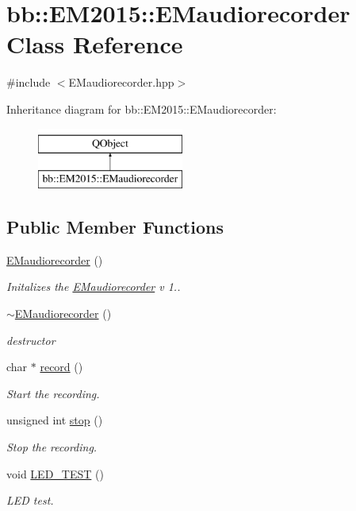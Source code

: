 \hypertarget{classbb_1_1_e_m2015_1_1_e_maudiorecorder}{}\section{bb\+:\+:E\+M2015\+:\+:E\+Maudiorecorder Class Reference}
\label{classbb_1_1_e_m2015_1_1_e_maudiorecorder}


{\ttfamily \#include $<$E\+Maudiorecorder.\+hpp$>$}

Inheritance diagram for bb\+:\+:E\+M2015\+:\+:E\+Maudiorecorder\+:\begin{figure}[H]
\begin{center}
\leavevmode
\includegraphics[height=2.000000cm]{classbb_1_1_e_m2015_1_1_e_maudiorecorder}
\end{center}
\end{figure}
\subsection*{Public Member Functions}
\begin{DoxyCompactItemize}
\item 
\hyperlink{classbb_1_1_e_m2015_1_1_e_maudiorecorder_aa4bd3ba6a17661c3ee13a26b6cfc93e9}{E\+Maudiorecorder} ()
\begin{DoxyCompactList}\small\item\em Initalizes the \hyperlink{classbb_1_1_e_m2015_1_1_e_maudiorecorder}{E\+Maudiorecorder} v 1.. \end{DoxyCompactList}\item 
\hyperlink{classbb_1_1_e_m2015_1_1_e_maudiorecorder_aac965866863be4881d177e9eadf1484b}{$\sim$\+E\+Maudiorecorder} ()
\begin{DoxyCompactList}\small\item\em destructor \end{DoxyCompactList}\item 
char $\ast$ \hyperlink{classbb_1_1_e_m2015_1_1_e_maudiorecorder_a126fa1d72742e99ff6acf5e86dc5bb2b}{record} ()
\begin{DoxyCompactList}\small\item\em Start the recording. \end{DoxyCompactList}\item 
unsigned int \hyperlink{classbb_1_1_e_m2015_1_1_e_maudiorecorder_a87098c0d5fab28ac54bf6c81d7c28993}{stop} ()
\begin{DoxyCompactList}\small\item\em Stop the recording. \end{DoxyCompactList}\item 
void \hyperlink{classbb_1_1_e_m2015_1_1_e_maudiorecorder_ae0cd02ef408c2f48cf26f6f0b2a428c8}{L\+E\+D\+\_\+\+T\+E\+S\+T} ()
\begin{DoxyCompactList}\small\item\em L\+E\+D test. \end{DoxyCompactList}\end{DoxyCompactItemize}

